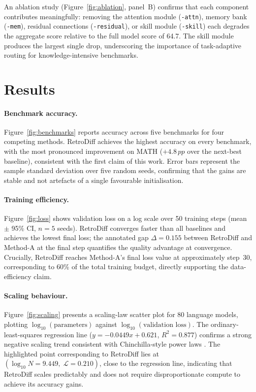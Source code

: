\documentclass[10pt,twocolumn]{article}
\newcommand{\methodname}{RetroDiff}
\newcommand{\pp}{\,pp}          %
\begin{document}
An ablation study (Figure~\ref{fig:ablation}, panel~B) confirms that each component
contributes meaningfully: removing the attention module (\texttt{-attn}),
memory bank (\texttt{-mem}), residual connections (\texttt{-residual}), or
skill module (\texttt{-skill}) each degrades the aggregate score relative to
the full model score of 64.7.  The skill module produces the largest single
drop, underscoring the importance of task-adaptive routing for
knowledge-intensive benchmarks.

\section{Results}
\label{sec:results}

\paragraph{Benchmark accuracy.}
Figure~\ref{fig:benchmarks} reports accuracy across five benchmarks for four
competing methods.  \methodname{} achieves the highest accuracy on every
benchmark, with the most pronounced improvement on MATH ($+4.8\pp$ over the
next-best baseline), consistent with the first claim of this work.  Error bars
represent the sample standard deviation over five random seeds, confirming that
the gains are stable and not artefacts of a single favourable initialisation.

\paragraph{Training efficiency.}
Figure~\ref{fig:loss} shows validation loss on a log scale over 50 training steps
(mean $\pm$ 95\% CI, $n=5$ seeds).  \methodname{} converges faster than all
baselines and achieves the lowest final loss; the annotated gap
$\Delta=0.155$ between \methodname{} and Method-A at the final step
quantifies the quality advantage at convergence.  Crucially, \methodname{}
reaches Method-A's final loss value at approximately step~30, corresponding to
60\% of the total training budget, directly supporting the data-efficiency
claim.

\paragraph{Scaling behaviour.}
Figure~\ref{fig:scaling} presents a scaling-law scatter plot for 80 language models,
plotting $\log_{10}(\text{parameters})$ against $\log_{10}(\text{validation
loss})$.  The ordinary-least-squares regression line
($y = -0.0449x + 0.621$, $R^{2}=0.877$) confirms a strong negative scaling
trend consistent with Chinchilla-style power laws \citep{kaplan2020scaling}.
The highlighted point corresponding to \methodname{} lies at
$(\log_{10}N=9.449,\;\mathcal{L}=0.210)$, close to the regression line,
indicating that \methodname{} scales predictably and does not require
disproportionate compute to achieve its accuracy gains.
\end{document}
